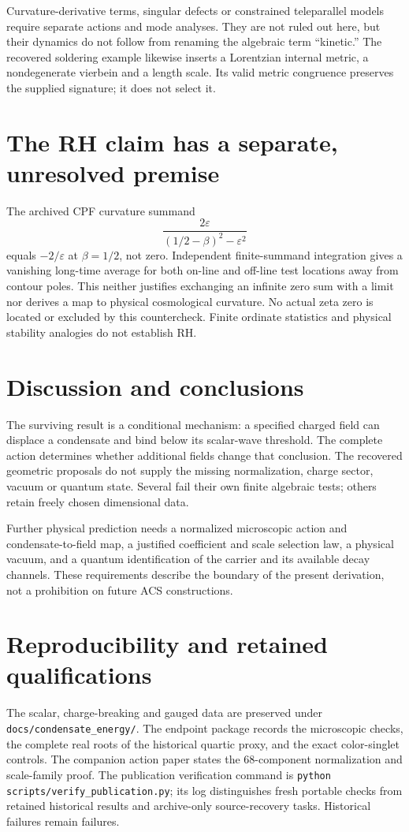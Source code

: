 \documentclass[11pt]{article}
\begin{document}
Curvature-derivative terms, singular defects or constrained teleparallel
models require separate actions and mode analyses. They are not ruled out
here, but their dynamics do not follow from renaming the algebraic term
``kinetic.'' The recovered soldering example likewise inserts a Lorentzian
internal metric, a nondegenerate vierbein and a length scale. Its valid
metric congruence preserves the supplied signature; it does not select it.

\section{The RH claim has a separate, unresolved premise}
The archived CPF curvature summand
\begin{equation}
 \frac{2\varepsilon}{(1/2-\beta)^2-\varepsilon^2}
\end{equation}
equals $-2/\varepsilon$ at $\beta=1/2$, not zero. Independent
finite-summand integration gives a vanishing long-time average for both
on-line and off-line test locations away from contour poles. This neither
justifies exchanging an infinite zero sum with a limit nor derives a map
to physical cosmological curvature. No actual zeta zero is located or
excluded by this countercheck. Finite ordinate statistics and physical
stability analogies do not establish RH.

\section{Discussion and conclusions}
The surviving result is a conditional mechanism: a specified charged field
can displace a condensate and bind below its scalar-wave threshold. The
complete action determines whether additional fields change that conclusion.
The recovered geometric proposals do not supply the missing normalization,
charge sector, vacuum or quantum state. Several fail their own finite
algebraic tests; others retain freely chosen dimensional data.

Further physical prediction needs a normalized microscopic action and
condensate-to-field map, a justified coefficient and scale selection law,
a physical vacuum, and a quantum identification of the carrier and its
available decay channels. These requirements describe the boundary of the
present derivation, not a prohibition on future ACS constructions.

\appendix
\section{Reproducibility and retained qualifications}
The scalar, charge-breaking and gauged data are preserved under
\texttt{docs/condensate\_energy/}. The endpoint package records the
microscopic checks, the complete real roots of the historical quartic
proxy, and the exact color-singlet controls. The companion action paper
states the 68-component normalization and scale-family proof.
The publication verification command is
\nolinkurl{python scripts/verify_publication.py}; its log distinguishes
fresh portable checks from retained historical results and archive-only
source-recovery tasks. Historical failures remain failures.
\end{document}
